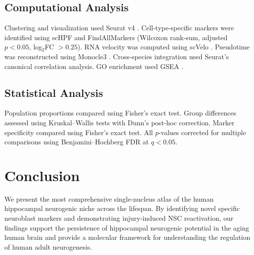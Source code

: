 \documentclass[11pt]{article}
\begin{document}
\subsection{Computational Analysis}

Clustering and visualization used Seurat v4 \citep{stuart2019comprehensive}. Cell-type-specific markers were identified using scHPF \citep{levitin2019novo} and FindAllMarkers (Wilcoxon rank-sum, adjusted $p < 0.05$, log$_2$FC $> 0.25$). RNA velocity was computed using scVelo \citep{lamanno2018rna}. Pseudotime was reconstructed using Monocle3 \citep{trapnell2014dynamics}. Cross-species integration used Seurat's canonical correlation analysis. GO enrichment used GSEA \citep{subramanian2005gene}.

\subsection{Statistical Analysis}

Population proportions compared using Fisher's exact test. Group differences assessed using Kruskal--Wallis tests with Dunn's post-hoc correction. Marker specificity compared using Fisher's exact test. All $p$-values corrected for multiple comparisons using Benjamini--Hochberg FDR at $q < 0.05$.

\section{Conclusion}

We present the most comprehensive single-nucleus atlas of the human hippocampal neurogenic niche across the lifespan. By identifying novel specific neuroblast markers and demonstrating injury-induced NSC reactivation, our findings support the persistence of hippocampal neurogenic potential in the aging human brain and provide a molecular framework for understanding the regulation of human adult neurogenesis.



\end{document}
